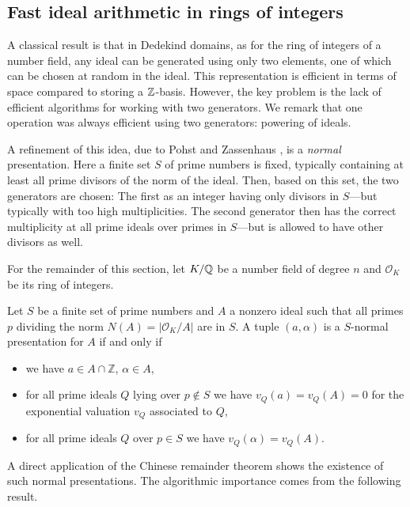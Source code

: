 \documentclass{sig-alternate-05-2015}
\begin{document}
\subsection{Fast ideal arithmetic in rings of integers}

A classical result is that in Dedekind domains, as for the ring of integers of a number field, any
ideal can be generated using only two elements, one of which can be chosen
at random in the ideal. This representation is efficient in terms of space compared to storing a
$\mathbb{Z}$-basis. However, the key problem is the lack of
efficient algorithms for working with two generators. We remark that one
operation was always efficient using two generators: powering of ideals.

A refinement of this idea, due to Pohst and Zassenhaus \cite[p. 400]{Pohst1997}, is a 
\textit{normal} presentation. Here a finite set $S$ of prime numbers
is fixed, typically containing at least all prime divisors of the norm of the ideal. Then,
based on this set, the two generators are chosen: The first as an integer
having only divisors in $S$---but typically with too high multiplicities.
The second generator then has the correct multiplicity at all prime ideals
over primes in $S$---but is allowed to have other divisors as well.

For the remainder of this section, let $K/\mathbb{Q}$ be a number field of
degree $n$ and $\mathcal O_K$ be its ring of integers.

\begin{definition}
Let $S$ be a finite set of prime numbers and $A$ a nonzero ideal such that
all primes $p$ dividing the norm $N(A) = |\mathcal O_K/A|$ are in $S$.
A tuple $(a, \alpha)$ is a $S$-normal presentation for $A$ if and only if
\begin{itemize}
\item we have $a\in A\cap \mathbb Z$, $\alpha\in A$,
\item for all prime ideals $Q$ lying over $p\not\in S$ we have $v_Q(a)= v_Q(A) = 0$
  for the exponential valuation $v_Q$ associated to $Q$,
\item for all prime ideals $Q$ over $p\in S$ we have $v_Q(\alpha) = v_Q(A)$.
\end{itemize}
\end{definition}

A direct application of the Chinese remainder theorem shows the existence of such normal presentations.
The algorithmic importance comes from the following result.
\end{document}
